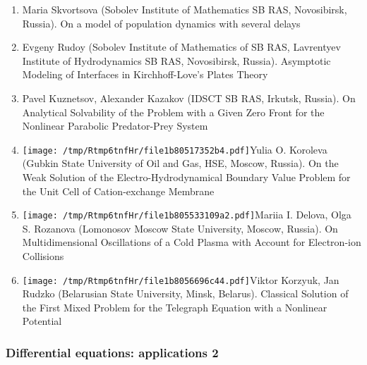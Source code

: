 \documentclass[
]{article}
\providecommand{\tightlist}{%
  \setlength{\itemsep}{0pt}\setlength{\parskip}{0pt}}
\begin{document}
\begin{enumerate}
\def\labelenumi{\arabic{enumi}.}
\tightlist
\item
  Maria Skvortsova (Sobolev Institute of Mathematics SB RAS,
  Novosibirsk, Russia). On a model of population dynamics with several
  delays
\item
  Evgeny Rudoy (Sobolev Institute of Mathematics of SB RAS, Lavrentyev
  Institute of Hydrodynamics SB RAS, Novosibirsk, Russia). Asymptotic
  Modeling of Interfaces in Kirchhoff-Love's Plates Theory
\item
  Pavel Kuznetsov, Alexander Kazakov (IDSCT SB RAS, Irkutsk, Russia). On
  Analytical Solvability of the Problem with a Given Zero Front for the
  Nonlinear Parabolic Predator-Prey System
\item
  \protect\texttt{[image: /tmp/Rtmp6tnfHr/file1b80517352b4.pdf]}Yulia
  O. Koroleva (Gubkin State University of Oil and Gas, HSE, Moscow,
  Russia). On the Weak Solution of the Electro-Hydrodynamical Boundary
  Value Problem for the Unit Cell of Cation-exchange Membrane
\item
  \protect\texttt{[image: /tmp/Rtmp6tnfHr/file1b805533109a2.pdf]}Mariia
  I. Delova, Olga S. Rozanova (Lomonosov Moscow State University,
  Moscow, Russia). On Multidimensional Oscillations of a Cold Plasma
  with Account for Electron-ion Collisions
\item
  \protect\texttt{[image: /tmp/Rtmp6tnfHr/file1b8056696c44.pdf]}Viktor
  Korzyuk, Jan Rudzko (Belarusian State University, Minsk, Belarus).
  Classical Solution of the First Mixed Problem for the Telegraph
  Equation with a Nonlinear Potential
\end{enumerate}

\hypertarget{dea2}{%
\subsubsection{Differential equations: applications 2}\label{dea2}}
\end{document}

